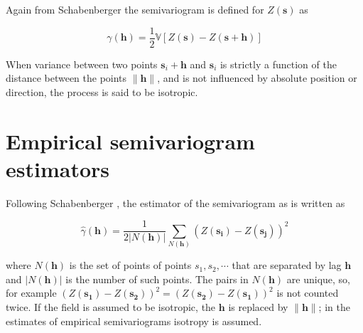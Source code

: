 \documentclass[phdcss]{SDSUThesis}
\begin{document}



Again from Schabenberger \cite{schabenberger-2001} the semivariogram is defined for $Z(\mathbf{s})$ as

\begin{equation}\label{SemivariogramEquation}
\gamma(\mathbf{h}) = \frac{1}{2} \mathbb{V}[Z(\mathbf{s})-Z(\mathbf{s}+\mathbf{h})]
\end{equation}

When variance between two points $\mathbf{s}_i + \mathbf{h}$  and $\mathbf{s}_i$ is strictly a function of the distance between the points $\lVert\mathbf{h} \rVert $, and is not influenced by absolute position or direction, the process is said to be isotropic.

\section{Empirical semivariogram estimators}
 Following Schabenberger \cite{schabenberger-2001}, the estimator of the semivariogram as is written as

\begin{equation}\label{EmpiricalSemivariogram}
   \widehat{\gamma}(\mathbf{h}) = \frac{1}{2|N(\mathbf{h})|} \sum_{N(\mathbf{h})} \left( Z(\mathbf{s_i}) - Z(\mathbf{s_j}) \right)^2
\end{equation}

where $N(\mathbf{h})$ is the set of points of points $s_1, s_2, \cdots$ that are separated by lag $\mathbf{h}$ and $|N(\mathbf{h})|$ is the number of such points. The pairs in $N(\mathbf{h})$ are unique, so, for example $\left( Z(\mathbf{s_1}) - Z(\mathbf{s_2}) \right)^2 = \left( Z(\mathbf{s_2}) - Z(\mathbf{s_1}) \right)^2$ is not counted twice. If the field is assumed to be isotropic, the $\mathbf{h}$ is replaced by $\lVert\mathbf{h} \rVert $; in the estimates of empirical semivariograms isotropy is assumed.
\end{document}
